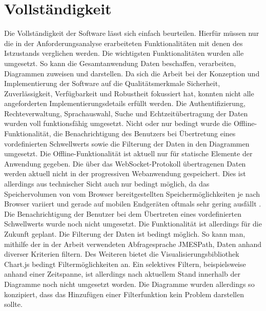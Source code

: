 \section{Vollständigkeit}
\label{sec:vollstaendigkeit}
Die Vollständigkeit der Software lässt sich einfach beurteilen. Hierfür müssen nur die in der Anforderungsanalyse
erarbeiteten Funktionalitäten mit denen des Istzustands verglichen werden. Die wichtigsten Funktionalitäten
wurden alle umgesetzt. So kann die Gesamtanwendung Daten beschaffen, verarbeiten, Diagrammen zuweisen und darstellen.
Da sich die Arbeit bei der Konzeption und Implementierung der Software auf die Qualitätsmerkmale Sicherheit,
Zuverlässigkeit, Verfügbarkeit und Robustheit fokussiert hat, konnten nicht alle angeforderten Implementierungsdetails
erfüllt werden. Die Authentifizierung, Rechteverwaltung, Sprachauswahl, Suche und Echtzeitübertragung der Daten wurden
voll funktionsfähig umgesetzt. Nicht oder nur bedingt wurde die Offline-Funktionalität, die Benachrichtigung
des Benutzers bei Übertretung eines vordefinierten Schwellwerts sowie die Filterung der Daten in den Diagrammen umgesetzt.
Die Offline-Funktionalität ist aktuell nur für statische Elemente der Anwendung gegeben. Die über das WebSocket-Protokoll
übertragenen Daten werden aktuell nicht in der progressiven Webanwendung gespeichert. Dies ist allerdings aus technischer
Sicht auch nur bedingt möglich, da das Speichervolumen von vom Browser bereitgestellten Speichermöglichkeiten
je nach Browser variiert und gerade auf mobilen Endgeräten oftmals sehr gering ausfällt \cite{HTML5RocksStorage}.
Die Benachrichtigung der Benutzer bei dem Übertreten eines vordefinierten Schwellwerts wurde noch nicht umgesetzt.
Die Funktionalität ist allerdings für die Zukunft geplant. Die Filterung der Daten ist bedingt möglich. So kann 
man, mithilfe der in der Arbeit verwendeten Abfragesprache JMESPath, Daten anhand diverser Kriterien filtern.
Des Weiteren bietet die Visualisierungsbibliothek Chart.js bedingt Filtermöglichkeiten an. Ein selektives Filtern,
beispielsweise anhand einer Zeitspanne, ist allerdings nach aktuellem Stand innerhalb der Diagramme noch nicht umgesetzt worden.
Die Diagramme wurden allerdings so konzipiert, dass das Hinzufügen einer Filterfunktion
kein Problem darstellen sollte.

